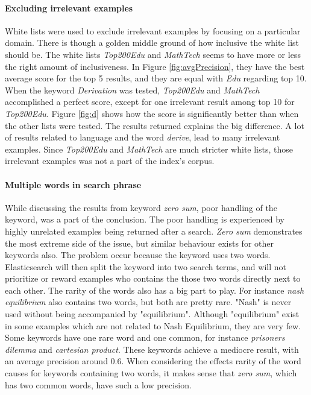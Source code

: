 \paragraph{Excluding irrelevant examples}
White lists were used to exclude irrelevant examples by focusing on a particular domain. There is though a golden middle ground of how inclusive the white list should be. The white lists \textit{Top200Edu} and \textit{MathTech} seems to have more or less the right amount of inclusiveness. In Figure \ref{fig:avgPrecision}, they have the best average score for the top 5 results, and they are equal with \textit{Edu} regarding top 10. When the keyword \textit{Derivation} was tested, \textit{Top200Edu} and \textit{MathTech} accomplished a perfect score, except for one irrelevant result among top 10 for \textit{Top200Edu}. Figure \ref{fig:d} shows how the score is significantly better than when the other lists were tested. The results returned explains the big difference. A lot of results related to language and the word \textit{derive}, lead to many irrelevant examples. Since \textit{Top200Edu} and \textit{MathTech} are much stricter white lists, those irrelevant examples was not a part of the index's corpus.

\paragraph{Multiple words in search phrase}
While discussing the results from keyword \textit{zero sum}, poor handling of the keyword, was a part of the conclusion. The poor handling is experienced by highly unrelated examples being returned after a search. \textit{Zero sum} demonstrates the most extreme side of the issue, but similar behaviour exists for other keywords also. The problem occur because the keyword uses two words. Elasticsearch will then split the keyword into two search terms, and will not prioritize or reward examples who contains the those two words directly next to each other. The rarity of the words also has a big part to play. For instance \textit{nash equilibrium} also contains two words, but both are pretty rare. "Nash" is never used without being accompanied by "equilibrium". Although "equilibrium" exist in some examples which are not related to Nash Equilibrium, they are very few. Some keywords have one rare word and one common, for instance \textit{prisoners dilemma} and \textit{cartesian product}. These keywords achieve a mediocre result, with an average precision around 0.6. When considering the effects rarity of the word causes for keywords containing two words, it makes sense that \textit{zero sum}, which has two common words, have such a low precision. 

